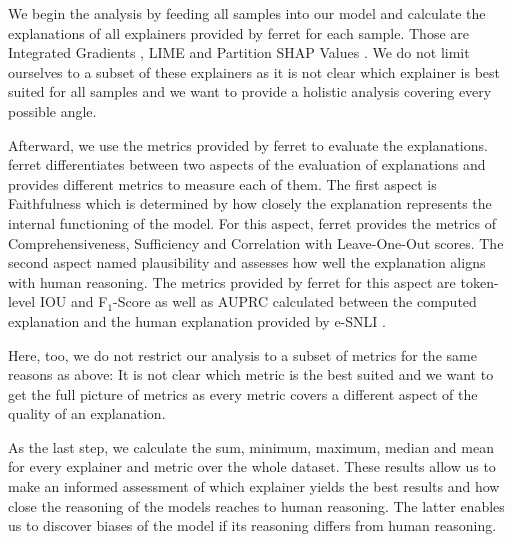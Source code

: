 We begin the analysis by feeding all samples into our model and calculate the explanations of all explainers provided by ferret \cite{ferret} for each sample. Those are Integrated Gradients \cite{integratedgradients}, \ac{LIME} \cite{lime} and Partition SHAP Values \cite{shap}. We do not limit ourselves to a subset of these explainers as it is not clear which explainer is best suited for all samples and we want to provide a holistic analysis covering every possible angle. 

Afterward, we use the metrics provided by ferret to evaluate the explanations. ferret differentiates between two aspects of the evaluation of explanations and provides different metrics to measure each of them. The first aspect is Faithfulness which is determined by how closely the explanation represents the internal functioning of the model. For this aspect, ferret provides the metrics of Comprehensiveness, Sufficiency and Correlation with Leave-One-Out scores. The second aspect named plausibility and assesses how well the explanation aligns with human reasoning. The metrics provided by ferret for this aspect are token-level \ac{IOU} and F$_1$-Score as well as \ac{AUPRC} calculated between the computed explanation and the human explanation provided by \ac{e-SNLI} \cite{ferret}.

Here, too, we do not restrict our analysis to a subset of metrics for the same reasons as above: It is not clear which metric is the best suited and we want to get the full picture of metrics as every metric covers a different aspect of the quality of an explanation.

As the last step, we calculate the sum, minimum, maximum, median and mean for every explainer and metric over the whole dataset. These results allow us to make an informed assessment of which explainer yields the best results and how close the reasoning of the models reaches to human reasoning. The latter enables us to discover biases of the model if its reasoning differs from human reasoning.